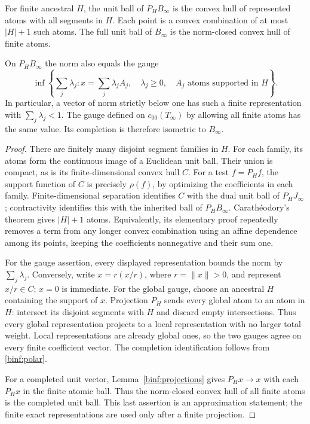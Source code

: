 \begin{lemma}
\label{binf:finite-hull}
For finite ancestral $H$, the unit ball of $P_HB_\infty$ is the convex
hull of represented atoms with all segments in $H$. Each point is a
convex combination of at most $|H|+1$ such atoms. The full unit ball
of $B_\infty$ is the norm-closed convex hull of finite atoms.

On $P_HB_\infty$ the norm also equals the gauge
\[
 \inf\left\{\sum_j\lambda_j:
   x=\sum_j\lambda_j A_j,\quad \lambda_j\ge0,\quad
   A_j\text{ atoms supported in }H\right\}.
\]
In particular, a vector of norm strictly below one has such a finite
representation with $\sum_j\lambda_j<1$. The gauge defined on
$c_{00}(T_\infty)$ by allowing all finite atoms has the same value.
Its completion is therefore isometric to $B_\infty$.
\end{lemma}
\begin{proof}
There are finitely many disjoint segment families in $H$. For each
family, its atoms form the continuous image of a Euclidean unit ball.
Their union is compact, as is its finite-dimensional convex hull $C$.
For a test $f=P_Hf$, the support function of $C$ is precisely $\rho(f)$,
by optimizing the coefficients in each family. Finite-dimensional
separation identifies $C$ with the dual unit ball of $P_HJ_\infty$;
contractivity identifies this with the inherited ball of $P_HB_\infty$.
Carath\'eodory's theorem gives $|H|+1$ atoms. Equivalently, its elementary
proof repeatedly removes a term from any longer convex combination
using an affine dependence among its points, keeping the coefficients
nonnegative and their sum one.

For the gauge assertion, every displayed representation bounds the
norm by $\sum_j\lambda_j$. Conversely, write $x=r(x/r)$, where
$r=\|x\|>0$, and represent $x/r\in C$; $x=0$ is immediate.
For the global gauge, choose an ancestral $H$ containing the support
of $x$. Projection $P_H$ sends every global atom to an atom in $H$:
intersect its disjoint segments with $H$ and discard empty intersections.
Thus every global representation projects to a local representation
with no larger total weight. Local representations are already global
ones, so the two gauges agree on every finite coefficient vector.
The completion identification follows from \eqref{binf:polar}.

For a completed unit vector, Lemma~\ref{binf:projections} gives
$P_Hx\to x$ with each $P_Hx$ in the finite atomic ball. Thus the
norm-closed convex hull of all finite atoms is the completed unit ball.
This last assertion is an approximation statement; the finite exact
representations are used only after a finite projection.
\end{proof}

